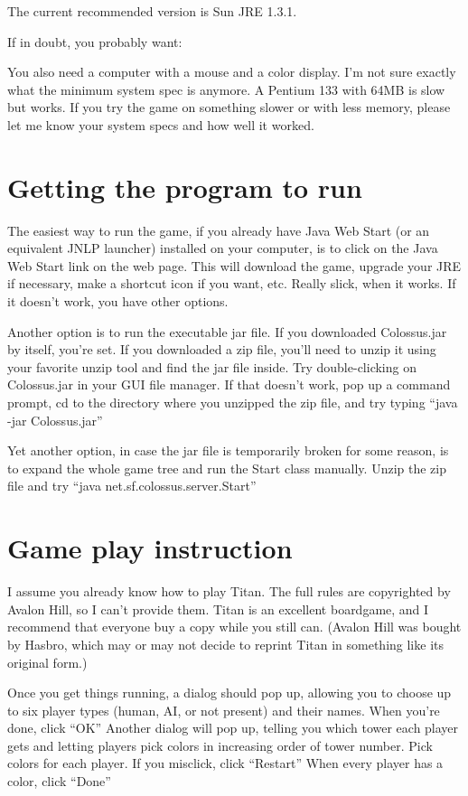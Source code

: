 \documentclass{article}
\begin{document}
The current recommended version is Sun JRE 1.3.1.

If in doubt, you probably want:

You also need a computer with a mouse and a color display. I'm not 
sure exactly what the minimum system spec is anymore. A Pentium
133 with 64MB is slow but works. If you try the game on something 
slower or with less memory, please let me know your system specs
and how well it worked.

\section{Getting the program to run}

The easiest way to run the game, if you already have Java Web Start (or
an equivalent JNLP launcher) installed on your computer, is to click on 
the Java Web Start link on the web page. This will download the game, 
upgrade your JRE if necessary, make a shortcut icon if you want, etc.
Really slick, when it works. If it doesn't work, you have other options.

Another option is to run the executable jar file. If you downloaded 
Colossus.jar by itself, you're set. If you downloaded a zip file, you'll 
need to unzip it using your favorite unzip tool and find the jar file 
inside. Try double-clicking on Colossus.jar in your GUI file manager. 
If that doesn't work, pop up a command prompt, cd to the directory where 
you unzipped the zip file, and try typing ``java -jar Colossus.jar''

Yet another option, in case the jar file is temporarily broken for some 
reason, is to expand the whole game tree and run the Start class manually. 
Unzip the zip file and try ``java net.sf.colossus.server.Start''

\section{Game play instruction}

I assume you already know how to play Titan. The full rules are copyrighted 
by Avalon Hill, so I can't provide them. Titan is an excellent boardgame, 
and I recommend that everyone buy a copy while you still can. (Avalon Hill 
was bought by Hasbro, which may or may not decide to reprint Titan in 
something like its original form.)

Once you get things running, a dialog should pop up, allowing you to
choose up to six player types (human, AI, or not present) and their names.
When you're done, click ``OK'' Another dialog will pop up, telling you which 
tower each player gets and letting players pick colors in increasing order 
of tower number. Pick colors for each player. If you misclick, click
``Restart'' When every player has a color, click ``Done''
\end{document}
